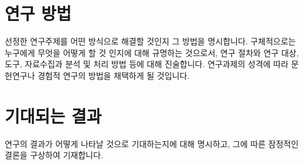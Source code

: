 \documentclass{article}
\begin{document}
\section{연구 방법}
 선정한 연구주제를 어떤 방식으로
해결할 것인지 그 방법을 명시합니다. 구체적으로는 누구에게
무엇을 어떻게 할 것 인지에 대해 규명하는 것으로서,
연구 절차와 연구 대상, 도구, 자료수집과 분석 및 처리 방법 등에
대해 진술합니다. 연구과제의 성격에 따라 문헌연구나
경험적 연구의 방법을 채택하게 될 것입니다.

\section{기대되는 결과}
연구의 결과가 어떻게 나타날 것으로 기대하는지에
대해 명시하고, 그에 따른 잠정적인 결론을 구상하여 기재합니다.



\end{document}
